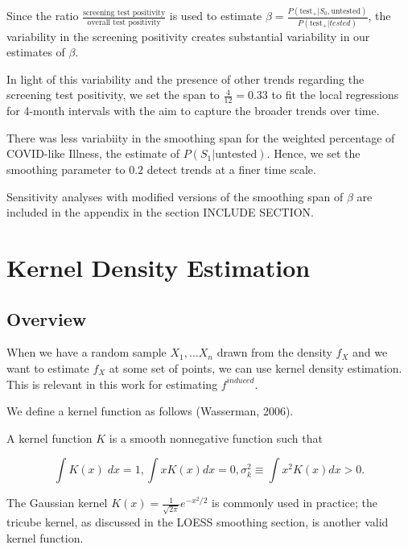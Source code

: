 \documentclass[12pt,twoside]{smiththesis}
\begin{document}
Since the ratio \(\frac{\text{screening test positivity}}{\text{overall test positivity}}\) is used to estimate \(\beta = \frac{P(\text{test}_+| S_0, \text{untested})}{P(\text{test}_+|tested)}\), the variability in the screening positivity creates substantial variability in our estimates of \(\beta\).

In light of this variability and the presence of other trends regarding the screening test positivity, we set the span to \(\frac{4}{12} = 0.33\) to fit the local regressions for 4-month intervals with the aim to capture the broader trends over time.

There was less variabiity in the smoothing span for the weighted percentage of COVID-like Illness, the estimate of \(P(S_1|\text{untested})\). Hence, we set the smoothing parameter to \(0.2\) detect trends at a finer time scale.

Sensitivity analyses with modified versions of the smoothing span of \(\beta\) are included in the appendix in the section INCLUDE SECTION.

\newpage

\hypertarget{kernel-density-estimation}{%
\section{Kernel Density Estimation}\label{kernel-density-estimation}}

\hypertarget{overview-1}{%
\subsection{Overview}\label{overview-1}}

When we have a random sample \(X_1,\dots X_n\) drawn from the density \(f_X\) and we want to estimate \(f_X\) at some set of points, we can use kernel density estimation. This is relevant in this work for estimating \(f^{induced}\).

We define a kernel function as follows (Wasserman, 2006).
\begin{tcolorbox}[title=Definition: Kernel Function]

A kernel function $K$ is a smooth nonnegative function such that 

$$\int K(x) \; dx = 1, \int x K(x) dx = 0, \sigma^2_k \equiv \int x^2 K(x) dx > 0.$$ 
\end{tcolorbox}
The Gaussian kernel \(K(x) = \frac{1}{\sqrt{2\pi}}e^{-x^2/2}\) is commonly used in practice; the tricube kernel, as discussed in the LOESS smoothing section, is another valid kernel function.
\end{document}
